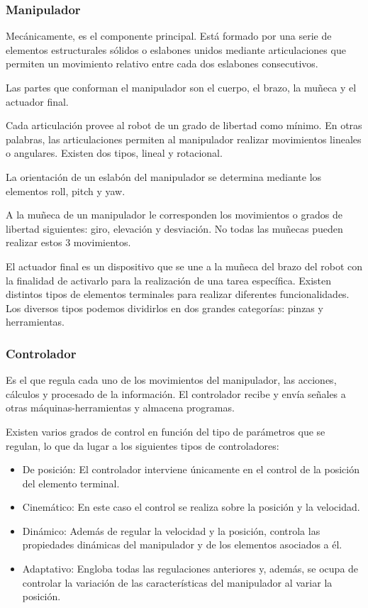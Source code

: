 \documentclass[12pt,a4papert,woside,openright,titlepage,final]{book}
\begin{document}
\subsubsection{Manipulador}

Mecánicamente, es el componente principal. Está formado por una serie de
elementos estructurales sólidos o eslabones unidos mediante articulaciones
que permiten un movimiento relativo entre cada dos eslabones consecutivos. 

Las partes que conforman el manipulador son el cuerpo, el brazo, la muñeca y el
actuador final. 

Cada articulación provee al robot de un grado de libertad como mínimo. En
otras palabras, las articulaciones permiten al manipulador realizar
movimientos lineales o angulares. Existen dos tipos, lineal y rotacional. 

La orientación de un eslabón del manipulador se determina
mediante los elementos roll, pitch y yaw.

A la muñeca de un manipulador le corresponden los movimientos o grados de
libertad siguientes: giro, elevación y desviación. No todas las muñecas pueden
realizar estos 3 movimientos. 

El actuador final es un dispositivo que se une a la muñeca del
brazo del robot con la finalidad de activarlo para la realización de una
tarea específica. Existen distintos tipos de elementos
terminales para realizar diferentes funcionalidades. Los diversos
tipos podemos dividirlos en dos grandes categorías: pinzas y herramientas.


\subsubsection{Controlador}
Es el que regula cada uno de los movimientos del manipulador, las acciones,
cálculos y procesado de la información. El controlador recibe y envía señales a
otras máquinas-herramientas y almacena programas.

Existen varios grados de control en función del tipo de
parámetros que se regulan, lo que da lugar a los siguientes tipos de
controladores:
\begin{itemize}
    \item De posición:
    El controlador interviene únicamente en el control de la posición del
    elemento terminal.
    \item Cinemático: 
    En este caso el control se realiza sobre la posición y la velocidad.
    \item Dinámico:
    Además de regular la velocidad y la posición, controla las propiedades
    dinámicas del manipulador y de los elementos asociados a él.
    \item Adaptativo: 
    Engloba todas las regulaciones anteriores y, además, se ocupa de controlar 
    la variación de las características del manipulador al variar la posición.
\end{itemize}
\end{document}
